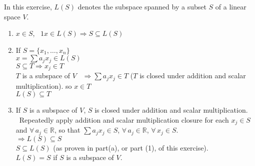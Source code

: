 \documentclass[twoside]{amsart}
\theoremstyle{plain}
\theoremstyle{definition}
\newcommand{\exercisehead}[1]
  {
   \noindent{\small\bf Exercise #1.}
   \smallskip}
\begin{document}
\exercisehead{22} In this exercise, $L(S)$ denotes the subspace spanned by a subset $S$ of a linear space $V$.  
\begin{enumerate}
\item $x \in S$, \quad \, $1x \in L(S) \Longrightarrow S \subseteq L(S)$
\item If $S = \{ x_1, \dots, x_n \}$ \\
  \quad $x = \sum a_j x_j  \in L(S)$ \medskip \\
  $S \subseteq T \Longrightarrow x_j \in T$ \\ 
  $T$ is a subspace of $V$ \,  $\Longrightarrow \sum a_j x_j \in T$ ($T$ is closed under addition and scalar multiplication).  so $x \in T$ \\
  $\boxed{ L(S) \subseteq T }$
\item If $S$ is a subspace of $V$, $S$ is closed under addition and scalar multiplication.  \smallskip \\
  \quad \, Repeatedly apply addition and scalar multiplication closure for each $x_j \in S$ and $\forall \, a_j \in \mathbb{R}$, so that $\sum a_j x_j \in S$, \quad $\forall \, a_j \in \mathbb{R}$, $\forall \, x_j \in S$.  \medskip \\
  $\Longrightarrow L(S) \subseteq S$ \medskip \\

$S \subseteq L(S)$ (as proven in part(a), or part (1), of this exercise).  \medskip \\
$L(S) = S$ if $S$ is a subspace of $V$.   \\


\end{enumerate}
\end{document}
